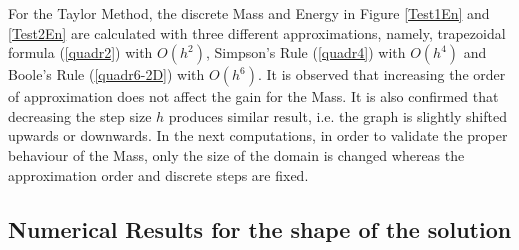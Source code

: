 \documentclass[%
 aip,
cp,  
 amsmath,amssymb,
 reprint,
]{iopconfser}
\newcommand{\rf}[1]{(\ref{#1})}
\begin{document}
For the Taylor Method, the discrete Mass and Energy in Figure \ref{Test1En} and \ref{Test2En} are calculated with three different approximations, namely, trapezoidal formula \rf{quadr2} with $O(h^2)$, Simpson's Rule \rf{quadr4} with $O(h^4)$ and Boole's Rule \rf{quadr6-2D} with $O(h^6)$. It is observed that increasing the order of approximation does not affect the gain for the Mass. It is also confirmed that decreasing the step size $h$ produces similar result, i.e. the graph is slightly shifted upwards or downwards. In the next computations, in order to validate the proper behaviour of the Mass, only the size of the domain is changed whereas the approximation order and discrete steps are fixed.

\fi

\subsection{Numerical Results for the shape of the solution}
\end{document}
